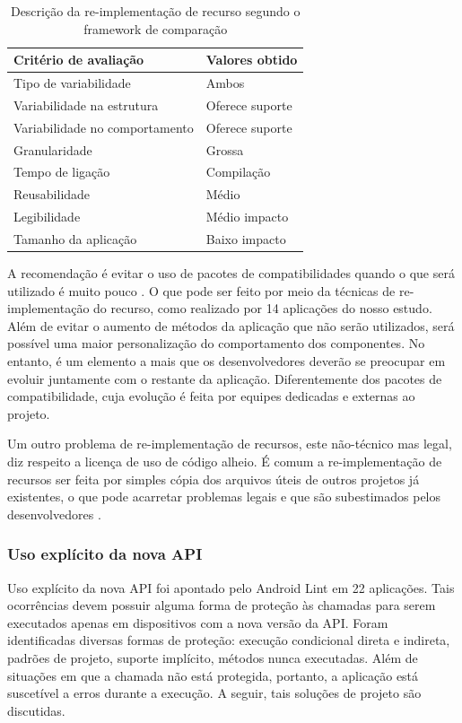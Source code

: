 \begin{table}[!htbp]
  \centering	
  \caption{Descrição da re-implementação de recurso segundo o framework de comparação}
  \label{tab:fw_reimplementacao}
  \begin{tabular}{ | l | l |}
    \hline
    \textbf{Critério de avaliação} 	& \textbf{Valores obtido}  \\ \hline
    Tipo de variabilidade 			& Ambos  \\ \hline
    Variabilidade na estrutura 		& Oferece suporte \\ \hline
    Variabilidade no comportamento 	& Oferece suporte \\ \hline
    Granularidade 					& Grossa \\ \hline
    Tempo de ligação 				& Compilação \\ \hline
    Reusabilidade 					& Médio \\ \hline
    Legibilidade 					& Médio impacto \\ \hline
    Tamanho da aplicação 			& Baixo impacto \\ \hline
  \end{tabular}
\end{table}

A recomendação é evitar o uso de pacotes de compatibilidades quando o que será
utilizado é muito pouco \cite{Estouro}. O que pode ser feito por meio da técnicas
de re-implementação do recurso, como realizado por 14 aplicações do nosso estudo.
Além de evitar o aumento de métodos da aplicação que não serão utilizados, será
possível uma maior personalização do comportamento dos componentes. No entanto,
é um elemento a mais que os desenvolvedores deverão se preocupar em evoluir
juntamente com o restante da aplicação. Diferentemente dos pacotes de compatibilidade,
cuja evolução é feita por equipes dedicadas e externas ao projeto.

Um outro problema de re-implementação de recursos, este não-técnico mas legal,
diz respeito a licença de uso de código alheio. É comum a re-implementação de
recursos ser feita por simples cópia dos arquivos úteis de outros projetos já
existentes, o que pode acarretar problemas legais e que são subestimados pelos
desenvolvedores \cite{Minelli}.

\subsubsection{Uso explícito da nova API}
Uso explícito da nova API foi apontado pelo Android Lint em 22 aplicações. Tais
ocorrências devem possuir alguma forma de proteção às chamadas para serem executados
apenas em dispositivos com a nova versão da API.  Foram identificadas diversas formas
de proteção: execução condicional direta e indireta, padrões de projeto, suporte implícito,
métodos nunca executadas. Além de situações em que a chamada não está protegida, portanto,
a aplicação está suscetível a erros durante a execução.  A seguir, tais soluções de projeto
são discutidas.

